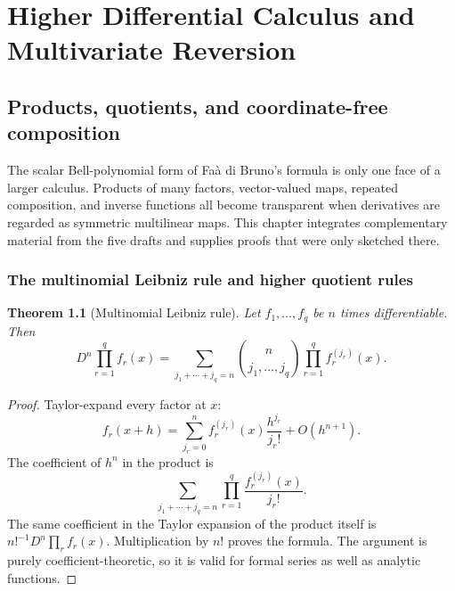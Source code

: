 \documentclass[11pt,a4paper,oneside,openany]{book}
\newtheorem{theorem}{Theorem}[chapter]
\theoremstyle{definition}
\theoremstyle{remark}
\begin{document}
\part{Higher Differential Calculus and Multivariate Reversion}

\chapter{Products, quotients, and coordinate-free composition}

The scalar Bell-polynomial form of Fa\`a di Bruno's formula is only one face of a
larger calculus. Products of many factors, vector-valued maps, repeated
composition, and inverse functions all become transparent when derivatives are
regarded as symmetric multilinear maps. This chapter integrates complementary
material from the five drafts and supplies proofs that were only sketched there.

\section{The multinomial Leibniz rule and higher quotient rules}

\begin{theorem}[Multinomial Leibniz rule]\label{unif:thm-multinomial-leibniz}
Let $f_1,\ldots,f_q$ be $n$ times differentiable. Then
\begin{equation}\label{unif:eq-multinomial-leibniz}
 D^n\prod_{r=1}^{q}f_r(x)
 =\sum_{j_1+\cdots+j_q=n}
   \binom{n}{j_1,\ldots,j_q}\prod_{r=1}^{q}f_r^{(j_r)}(x).
\end{equation}
\end{theorem}
\begin{proof}
Taylor-expand every factor at $x$:
\[
 f_r(x+h)=\sum_{j_r=0}^{n}f_r^{(j_r)}(x)\frac{h^{j_r}}{j_r!}+O(h^{n+1}).
\]
The coefficient of $h^n$ in the product is
\[
 \sum_{j_1+\cdots+j_q=n}\prod_{r=1}^{q}
 \frac{f_r^{(j_r)}(x)}{j_r!}.
\]
The same coefficient in the Taylor expansion of the product itself is
$n!^{-1}D^n\prod_r f_r(x)$. Multiplication by $n!$ proves the formula. The
argument is purely coefficient-theoretic, so it is valid for formal series as
well as analytic functions.
\end{proof}
\end{document}

